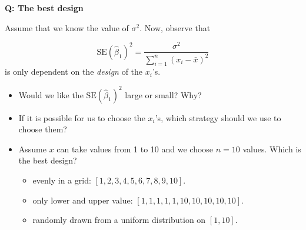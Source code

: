 \documentclass[ignorenonframetext,]{beamer}
\providecommand{\tightlist}{%
  \setlength{\itemsep}{0pt}\setlength{\parskip}{0pt}}
\begin{document}
\begin{frame}

\textbf{Q: The best design}

Assume that we know the value of \(\sigma^2\). Now, observe that

\[\text{SE}(\hat{\beta}_1)^2 = \frac{\sigma^2}{\sum_{i=1}^n (x_i-\bar{x})^2}\]
is only dependent on the \emph{design} of the \(x_i\)'s.

\begin{itemize}
\tightlist
\item
  Would we like the \(\text{SE}(\hat{\beta}_1)^2\) large or small? Why?
\item
  If it is possible for us to choose the \(x_i\)'s, which strategy
  should we use to choose them?
\item
  Assume \(x\) can take values from 1 to 10 and we choose \(n=10\)
  values. Which is the best design?

  \begin{itemize}
  \tightlist
  \item
    evenly in a grid: \([1,2,3,4,5,6,7,8,9,10]\).
  \item
    only lower and upper value: \([1,1,1,1,1,10,10,10,10,10]\).
  \item
    randomly drawn from a uniform distribution on \([1,10]\).
  \end{itemize}
\end{itemize}

\end{frame}
\end{document}
